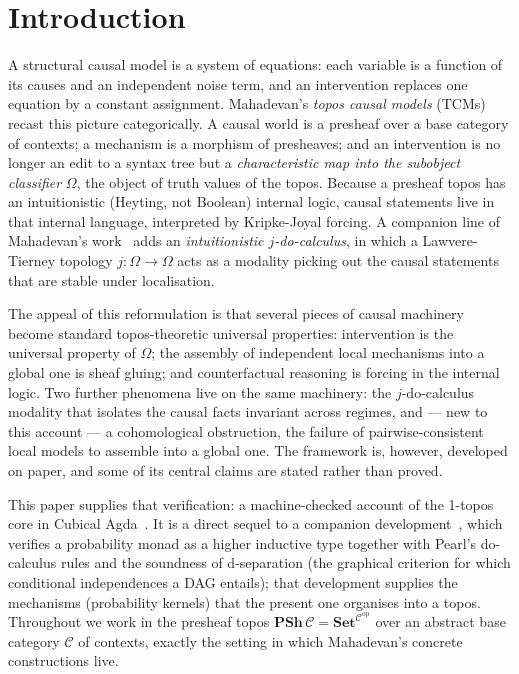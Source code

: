 \documentclass{lmcs}
\newcommand{\Om}{\Omega}
\newcommand{\PSh}{\mathbf{PSh}}
\newcommand{\Set}{\mathbf{Set}}
\begin{document}
\maketitle

\section{Introduction}\label{sec:intro}

A structural causal model is a system of equations: each variable is a function of its causes and an independent noise term, and an intervention replaces one equation by a constant assignment.
Mahadevan's \emph{topos causal models} (TCMs)~\cite{mahadevan-2025a,mahadevan-2025c} recast this picture categorically.
A causal world is a presheaf over a base category of contexts; a mechanism is a morphism of presheaves; and an intervention is no longer an edit to a syntax tree but a \emph{characteristic map into the subobject classifier} $\Om$, the object of truth values of the topos.
Because a presheaf topos has an intuitionistic (Heyting, not Boolean) internal logic, causal statements live in that internal language, interpreted by Kripke-Joyal forcing.
A companion line of Mahadevan's work~\cite{mahadevan-2025b} adds an \emph{intuitionistic $j$-do-calculus}, in which a Lawvere-Tierney topology $j : \Om \to \Om$ acts as a modality picking out the causal statements that are stable under localisation.

The appeal of this reformulation is that several pieces of causal machinery become standard topos-theoretic universal properties: intervention is the universal property of $\Om$; the assembly of independent local mechanisms into a global one is sheaf gluing; and counterfactual reasoning is forcing in the internal logic.
Two further phenomena live on the same machinery: the $j$-do-calculus modality that isolates the causal facts invariant across regimes, and --- new to this account --- a cohomological obstruction, the failure of pairwise-consistent local models to assemble into a global one.
The framework is, however, developed on paper, and some of its central claims are stated rather than proved.

This paper supplies that verification: a machine-checked account of the 1-topos core in Cubical Agda~\cite{cchm-2018,cubical-agda}.
It is a direct sequel to a companion development~\cite{sargsyan-cubical-dsep}, which verifies a probability monad as a higher inductive type together with Pearl's do-calculus rules and the soundness of d-separation (the graphical criterion for which conditional independences a DAG entails); that development supplies the mechanisms (probability kernels) that the present one organises into a topos.
Throughout we work in the presheaf topos $\PSh\,\mathcal{C} = \Set^{\mathcal{C}^{\mathrm{op}}}$ over an abstract base category $\mathcal{C}$ of contexts, exactly the setting in which Mahadevan's concrete constructions live.
\end{document}
